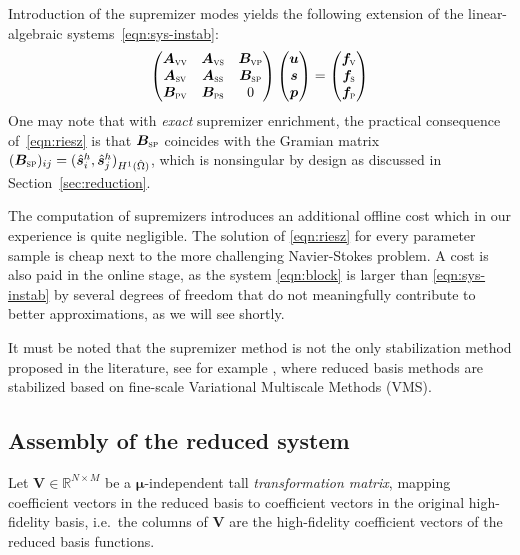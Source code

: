 \documentclass[onecolumn, twoside, a4paper, 11pt]{article}
\begin{document}
Introduction of the supremizer modes yields the following extension of the linear-algebraic
systems~\eqref{eqn:sys-instab}:
%
\begin{equation}
  \label{eqn:block}
  \begin{pmatrix}
    \bm A_\textsc{vv} & \bm A_\textsc{vs} & \bm B_\textsc{vp} \\
    \bm A_\textsc{sv} & \bm A_\textsc{ss} & \bm B_\textsc{sp} \\
    \bm B_\textsc{pv} & \bm B_\textsc{ps} & 0 \end{pmatrix}
  \begin{pmatrix} \bm u \\ \bm s \\ \bm p \end{pmatrix}
  =
  \begin{pmatrix} \bm f_\textsc{v} \\ \bm f_\textsc{s} \\ \bm f_\textsc{p} \end{pmatrix}
\end{equation}
%
One may note that with \emph{exact} supremizer enrichment, the practical
consequence of~\eqref{eqn:riesz} is that $\bm B_\textsc{sp}$ coincides
with the Gramian matrix $\smash[t]{(\bm B_\textsc{sp})_{ij}=( \hat{\bm s}^h_i, \hat{\bm s}^h_j )_{H^1(\hat{\Omega})}}$,
which is nonsingular by design as discussed in Section~\ref{sec:reduction}.

The computation of supremizers introduces an additional offline cost which in
our experience is quite negligible. The solution of \eqref{eqn:riesz} for every
parameter sample is cheap next to the more challenging Navier-Stokes problem. A
cost is also paid in the online stage, as the system \eqref{eqn:block} is larger
than \eqref{eqn:sys-instab} by several degrees of freedom that do not
meaningfully contribute to better approximations, as we will see shortly.

It must be noted that the supremizer method is not the only stabilization method
proposed in the literature, see for example
\cite{Weller2008nml,Bergmann2009erp}, where reduced basis methods are stabilized
based on fine-scale Variational Multiscale Methods (VMS).


\subsection{Assembly of the reduced system}
Let $\bm V \in \mathbb{R}^{N \times M}$ be a $\bm \mu$-independent
tall \emph{transformation matrix}, mapping coefficient vectors in the
reduced basis to coefficient vectors in the original high-fidelity
basis, i.e.~the columns of $\bm V$ are the high-fidelity coefficient
vectors of the reduced basis functions.
\end{document}
